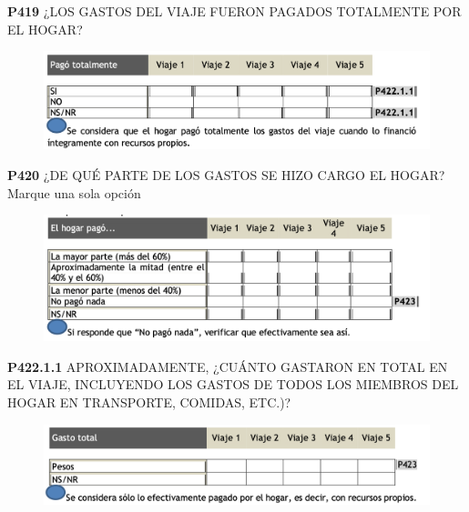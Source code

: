 \documentclass[
  openany]{book}
\begin{document}
\textbf{P419} ¿LOS GASTOS DEL VIAJE FUERON PAGADOS TOTALMENTE POR EL HOGAR?

\begin{figure}

{\centering \includegraphics[width=1\linewidth]{imagenes/figura6-186} 

}

\end{figure}

\textbf{P420} ¿DE QUÉ PARTE DE LOS GASTOS SE HIZO CARGO EL HOGAR?
Marque una sola opción

\begin{figure}

{\centering \includegraphics[width=1\linewidth]{imagenes/figura6-187} 

}

\end{figure}

\textbf{P422.1.1} APROXIMADAMENTE, ¿CUÁNTO GASTARON EN TOTAL EN EL VIAJE, INCLUYENDO
LOS GASTOS DE TODOS LOS MIEMBROS DEL HOGAR EN TRANSPORTE, COMIDAS, ETC.)?

\begin{figure}

{\centering \includegraphics[width=1\linewidth]{imagenes/figura6-188} 

}

\end{figure}
\end{document}
